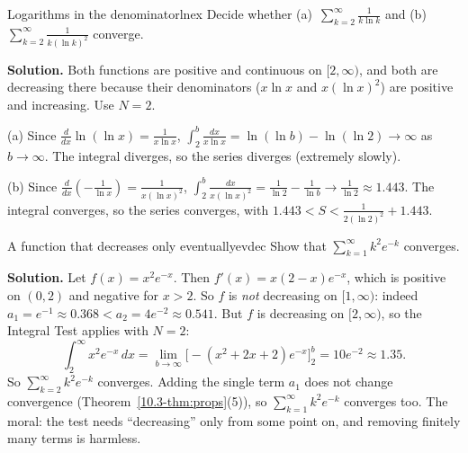 \documentclass[11pt]{article}
\begin{document}
\begin{exmp}{Logarithms in the denominator}{lnex}
Decide whether (a)~$\displaystyle\sum_{k=2}^\infty\frac1{k\ln k}$ and (b)~$\displaystyle\sum_{k=2}^\infty\frac1{k(\ln k)^2}$ converge.

\textbf{Solution.} Both functions are positive and continuous on $[2,\infty)$, and both are decreasing there because their denominators ($x\ln x$ and $x(\ln x)^2$) are positive and increasing. Use $N=2$.

(a) Since $\frac d{dx}\ln(\ln x)=\frac1{x\ln x}$, $\displaystyle\int_2^b\frac{dx}{x\ln x}=\ln(\ln b)-\ln(\ln2)\to\infty$ as $b\to\infty$. The integral diverges, so the series diverges (extremely slowly).

(b) Since $\frac d{dx}\left(-\frac1{\ln x}\right)=\frac1{x(\ln x)^2}$, $\displaystyle\int_2^b\frac{dx}{x(\ln x)^2}=\frac1{\ln2}-\frac1{\ln b}\to\frac1{\ln2}\approx1.443$. The integral converges, so the series converges, with $1.443<S<\frac1{2(\ln2)^2}+1.443$.
\end{exmp}

\begin{exmp}{A function that decreases only eventually}{evdec}
Show that $\displaystyle\sum_{k=1}^\infty k^2e^{-k}$ converges.

\textbf{Solution.} Let $f(x)=x^2e^{-x}$. Then $f'(x)=x(2-x)e^{-x}$, which is positive on $(0,2)$ and negative for $x>2$. So $f$ is \emph{not} decreasing on $[1,\infty)$: indeed $a_1=e^{-1}\approx0.368<a_2=4e^{-2}\approx0.541$. But $f$ is decreasing on $[2,\infty)$, so the Integral Test applies with $N=2$:
\[
\int_2^\infty x^2e^{-x}\,dx=\lim_{b\to\infty}\Big[-(x^2+2x+2)e^{-x}\Big]_2^b=10e^{-2}\approx1.35 .
\]
So $\sum_{k=2}^\infty k^2e^{-k}$ converges. Adding the single term $a_1$ does not change convergence (Theorem~\ref{10.3-thm:props}(5)), so $\sum_{k=1}^\infty k^2e^{-k}$ converges too. The moral: the test needs ``decreasing'' only from some point on, and removing finitely many terms is harmless.
\end{exmp}
\end{document}
